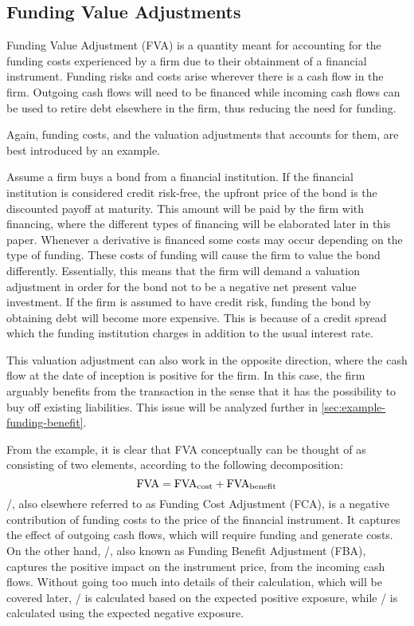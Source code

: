 \documentclass[main.tex]{subfiles}
\begin{document}
    \subsection{Funding Value Adjustments}
        Funding Value Adjustment (FVA) is a quantity meant for accounting for the funding costs 
        experienced by a firm due to their obtainment of a financial instrument.
        Funding risks and costs arise wherever there is a cash flow in the firm. 
        Outgoing cash flows will need to be financed while incoming cash flows
        can be used to retire debt elsewhere in the firm, thus reducing the need for funding.

        Again, funding costs, and the valuation adjustments that accounts for them,
        are best introduced by an example.

        Assume a firm buys a bond from a financial institution.
        If the financial institution is considered credit risk-free,
        the upfront price of the bond is the discounted payoff at maturity.
        This amount will be paid by the firm with financing, where the different types of financing will be elaborated later in this paper.
        Whenever a derivative is financed some costs may occur depending on the type of funding.
        These costs of funding will cause the firm to value the bond differently.
        Essentially, this means that the firm will demand a valuation adjustment 
        in order for the bond not to be a negative net present value investment. 
        If the firm is assumed to have credit risk, funding the bond by obtaining debt will become more expensive. 
        This is because of a credit spread which the funding institution charges in addition to the usual interest rate.
        
        This valuation adjustment can also work in the opposite direction, 
        where the cash flow at the date of inception is positive for the firm.
        In this case, the firm arguably benefits from the transaction 
        in the sense that it has the possibility to buy off existing liabilities.
        This issue will be analyzed further in \cref{sec:example-funding-benefit}.
        
        From the example, it is clear that FVA conceptually can be thought of 
        as consisting of two elements, according to the following decomposition:
        \begin{equation}
            \FVA/ = \FCA/ + \FBA/
        \end{equation}
        \FCA/, also elsewhere referred to as Funding Cost Adjustment (FCA), 
        is a negative contribution of funding costs to the price of the financial instrument.
        It captures the effect of outgoing cash flows, which will require funding and generate costs.
        On the other hand, \FBA/, also known as Funding Benefit Adjustment (FBA), 
        captures the positive impact on the instrument price, from the incoming cash flows.
        Without going too much into details of their calculation, which will be covered later,
        \FCA/ is calculated based on the expected positive exposure, 
        while \FBA/ is calculated using the expected negative exposure. 
\end{document}
